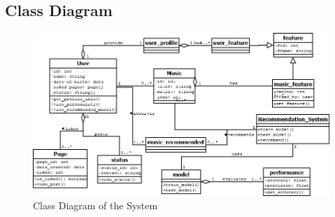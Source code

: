 \newpage
\subsection{Class Diagram}
\begin{figure}[!ht]
\centering
\includegraphics[width = 16 cm]{fig/class.png}
\caption{Class Diagram of the System}
\label{fig:class}
\end{figure}

\newpage
